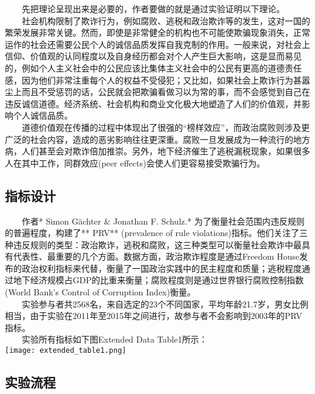 \documentclass[11pt]{article}
\makeatletter
\def\maxwidth{\ifdim\Gin@nat@width>\linewidth\linewidth
    \else\Gin@nat@width\fi}
\let\Oldincludegraphics\includegraphics
\renewcommand{\includegraphics}[1]{\Oldincludegraphics[width=.8\maxwidth]{#1}}
\makeatother
\begin{document}
    　　先把理论呈现出来是必要的，作者要做的就是通过实验证明以下理论。\\
　　社会机构限制了欺诈行为，例如腐败、逃税和政治欺诈等的发生，这对一国的繁荣发展非常关键。然而，即使是非常健全的机构也不可能使欺骗现象消失，正常运作的社会还需要公民个人的诚信品质发挥自我克制的作用。一般来说，对社会上信仰、价值观的认同程度以及自身经历都会对个人产生巨大影响，这是显而易见的，例如个人主义社会中的公民应该比集体主义社会中的公民有更高的道德责任感，因为他们非常注重每个人的权益不受侵犯；又比如，如果社会上欺诈行为甚嚣尘上而且不受惩罚的话，公民就会把欺骗看做习以为常的事，而不会感觉到自己在违反诚信道德。经济系统、社会机构和商业文化极大地塑造了人们的价值观，并影响个人诚信品质。\\
　　道德价值观在传播的过程中体现出了很强的``榜样效应''，而政治腐败则涉及更广泛的社会内容，造成的恶劣影响往往更深重。腐败一旦发展成为一种流行的地方病，人们甚至会对欺诈倍加推崇。另外，地下经济催生了逃税漏税现象，如果很多人在其中工作，同群效应(peer
effects)会使人们更容易接受欺骗行为。

    \subsection{指标设计}\label{ux6307ux6807ux8bbeux8ba1}

    　　作者* Simon Gächter \& Jonathan F. Schulz.*
为了衡量社会范围内违反规则的普遍程度，构建了** PRV** (prevalence of rule
violations)指标。他们关注了三种违反规则的类型：政治欺诈，逃税和腐败，这三种类型可以衡量社会欺诈中最具有代表性、最重要的几个方面。数据方面，政治欺诈程度是通过Freedom
House发布的政治权利指标来代替，衡量了一国政治实践中的民主程度和质量；逃税程度通过地下经济规模占GDP的比重来衡量；腐败程度则是通过世界银行腐败控制指数(World
Bank's Control of Corruption Index)衡量。\\
　　实验参与者共2568名，来自选定的23个不同国家，平均年龄21.7岁，男女比例相当，由于实验在2011年至2015年之间进行，故参与者不会影响到2003年的PRV指标。\\
　　实验所有指标如下图Extended Data Table1所示：\\
\texttt{[image: extended\_table1.png]}

    \subsection{实验流程}\label{ux5b9eux9a8cux6d41ux7a0b}
\end{document}

